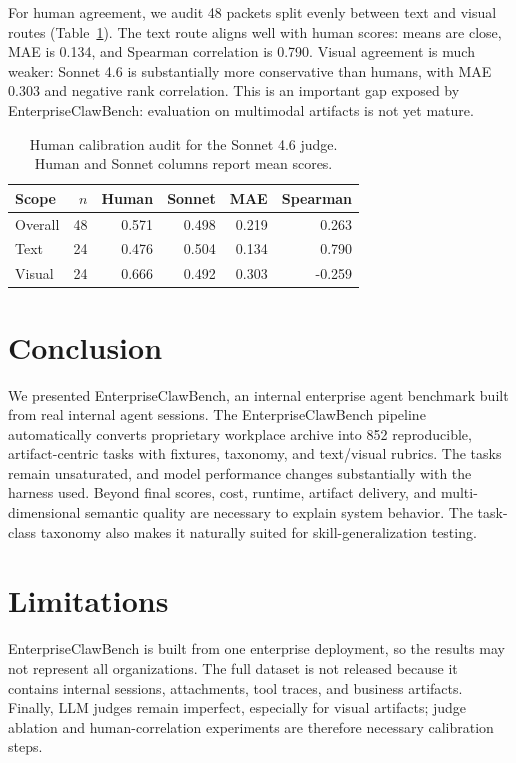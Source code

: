 \documentclass{llmxive}
\providecommand{\ecb}{EnterpriseClawBench}
\providecommand{\ecbpipe}{EnterpriseClawBench pipeline}
\begin{document}
For human agreement, we audit 48 packets split evenly between text and visual routes (Table~\ref{ecblink:tab:human-judge}). The text route aligns well with human scores: means are close, MAE is 0.134, and Spearman correlation is 0.790. Visual agreement is much weaker: Sonnet 4.6 is substantially more conservative than humans, with MAE 0.303 and negative rank correlation. This is an important gap exposed by \ecb{}: evaluation on multimodal artifacts is not yet mature. 
\begin{table}[ht]
\centering
\small
\setlength{\tabcolsep}{3.6pt}
\begin{tabular}{lrrrrr}
\toprule
Scope & $n$ & Human & Sonnet & MAE & Spearman \\
\midrule
Overall & 48 & 0.571 & 0.498 & 0.219 & 0.263 \\
Text & 24 & 0.476 & 0.504 & 0.134 & 0.790 \\
Visual & 24 & 0.666 & 0.492 & 0.303 & -0.259 \\
\bottomrule
\end{tabular}
\caption{Human calibration audit for the Sonnet 4.6 judge. Human and Sonnet columns report mean scores.}
\label{ecblink:tab:human-judge}
\end{table}

\section{Conclusion}
We presented \ecb{}, an internal enterprise agent benchmark built from real internal agent sessions. The \ecbpipe{} automatically converts proprietary workplace archive into 852 reproducible, artifact-centric tasks with fixtures, taxonomy, and text/visual rubrics. The tasks remain unsaturated, and model performance changes substantially with the harness used. Beyond final scores, cost, runtime, artifact delivery, and multi-dimensional semantic quality are necessary to explain system behavior. The task-class taxonomy also makes it naturally suited for skill-generalization testing.



\section{Limitations}
\ecb{} is built from one enterprise deployment, so the results may not represent all organizations. The full dataset is not released because it contains internal sessions, attachments, tool traces, and business artifacts. Finally, LLM judges remain imperfect, especially for visual artifacts; judge ablation and human-correlation experiments are therefore necessary calibration steps.
\end{document}
